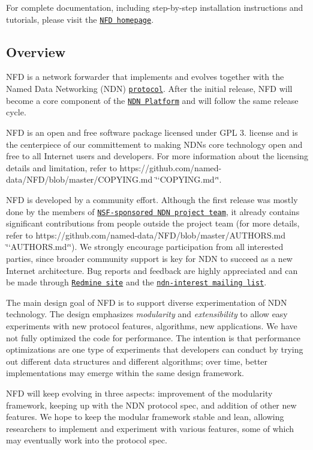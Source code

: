 For complete documentation, including step-\/by-\/step installation instructions and tutorials, please visit the \href{http://named-data.net/doc/NFD/}{\tt N\+FD homepage}.

\subsection*{Overview}

N\+FD is a network forwarder that implements and evolves together with the Named Data Networking (N\+DN) \href{http://named-data.net/doc/ndn-tlv/}{\tt protocol}. After the initial release, N\+FD will become a core component of the \href{http://named-data.net/codebase/platform/}{\tt N\+DN Platform} and will follow the same release cycle.

N\+FD is an open and free software package licensed under G\+PL 3. license and is the centerpiece of our committement to making N\+DN\textquotesingle{}s core technology open and free to all Internet users and developers. For more information about the licensing details and limitation, refer to https\+://github.com/named-\/data/\+N\+F\+D/blob/master/\+C\+O\+P\+Y\+I\+N\+G.\+md \char`\"{}`\+C\+O\+P\+Y\+I\+N\+G.\+md`\char`\"{}.

N\+FD is developed by a community effort. Although the first release was mostly done by the members of \href{http://named-data.net/project/participants/}{\tt N\+S\+F-\/sponsored N\+DN project team}, it already contains significant contributions from people outside the project team (for more details, refer to https\+://github.com/named-\/data/\+N\+F\+D/blob/master/\+A\+U\+T\+H\+O\+R\+S.\+md \char`\"{}`\+A\+U\+T\+H\+O\+R\+S.\+md`\char`\"{}). We strongly encourage participation from all interested parties, since broader community support is key for N\+DN to succeed as a new Internet architecture. Bug reports and feedback are highly appreciated and can be made through \href{http://redmine.named-data.net/projects/nfd}{\tt Redmine site} and the \href{http://www.lists.cs.ucla.edu/mailman/listinfo/ndn-interest}{\tt ndn-\/interest mailing list}.

The main design goal of N\+FD is to support diverse experimentation of N\+DN technology. The design emphasizes {\itshape modularity} and {\itshape extensibility} to allow easy experiments with new protocol features, algorithms, new applications. We have not fully optimized the code for performance. The intention is that performance optimizations are one type of experiments that developers can conduct by trying out different data structures and different algorithms; over time, better implementations may emerge within the same design framework.

N\+FD will keep evolving in three aspects\+: improvement of the modularity framework, keeping up with the N\+DN protocol spec, and addition of other new features. We hope to keep the modular framework stable and lean, allowing researchers to implement and experiment with various features, some of which may eventually work into the protocol spec. 